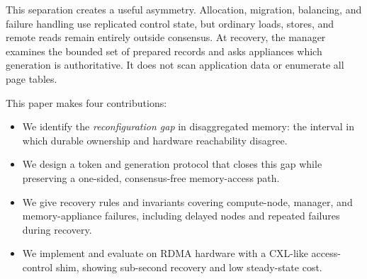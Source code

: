 This separation creates a useful asymmetry. Allocation, migration, balancing,
and failure handling use replicated control state, but ordinary loads, stores,
and remote reads remain entirely outside consensus. At recovery, the manager
examines the bounded set of prepared records and asks appliances which
generation is authoritative. It does not scan application data or enumerate
all page tables.

This paper makes four contributions:

\begin{itemize}[leftmargin=1.25em]
  \item We identify the \emph{reconfiguration gap} in disaggregated memory:
  the interval in which durable ownership and hardware reachability disagree.
  \item We design a token and generation protocol that closes this gap while
  preserving a one-sided, consensus-free memory-access path.
  \item We give recovery rules and invariants covering compute-node,
  manager, and memory-appliance failures, including delayed nodes and repeated
  failures during recovery.
  \item We implement and evaluate \system on RDMA hardware with a CXL-like
  access-control shim, showing sub-second recovery and low steady-state cost.
\end{itemize}
